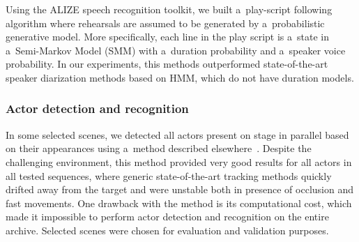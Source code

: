 \documentclass[conference]{IEEEtran}
\begin{document}
Using the ALIZE speech recognition toolkit, we built a~play-script following algorithm where rehearsals are assumed to be generated by a~probabilistic generative model.  More specifically, each  line in the play script is a~state in a~Semi-Markov Model (SMM) with a~duration probability and a~speaker voice probability. In our experiments, this methods outperformed state-of-the-art speaker diarization methods based on HMM, which do not have duration models. %
 



\subsubsection{Actor detection and recognition} 

In some selected scenes, we  detected all actors present on stage in parallel based on their appearances
using a~method described elsewhere~\cite{Gandhi13,Gandhi15}. Despite the challenging environment, this method provided very good results for  all actors in all tested sequences, where generic state-of-the-art tracking methods quickly drifted away from the target and were unstable both in presence of occlusion and fast movements. One drawback with the method is its computational cost, which made it impossible to perform
actor detection and recognition on the entire archive. Selected scenes were chosen for evaluation and validation purposes.

\end{document}
